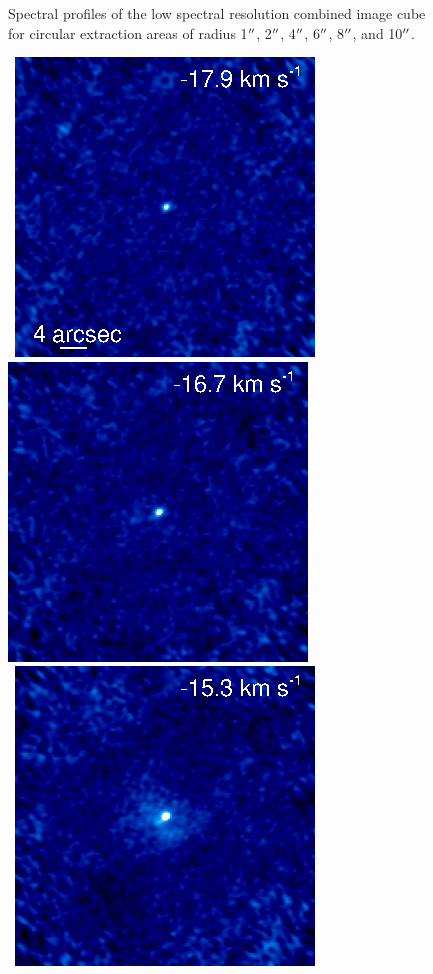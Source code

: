 \documentclass[preprint2]{aastex}
\begin{document}
\clearpage

\begin{figure}
\caption{Spectral profiles of the low spectral resolution combined image cube for circular extraction areas of radius 1$\mbox{$^{\prime\prime}$}$, 2$\mbox{$^{\prime\prime}$}$, 4$\mbox{$^{\prime\prime}$}$, 6$\mbox{$^{\prime\prime}$}$, 8$\mbox{$^{\prime\prime}$}$, and 10$\mbox{$^{\prime\prime}$}$.}
\label{fig:fig4}
\end{figure}

\clearpage

\begin{figure}[hbt!]
\mbox{
          \includegraphics[]{chan41.ps}
          \includegraphics[]{chan40.ps}
          }
\\
\mbox{
          \includegraphics[]{chan39.ps}
}
\end{figure}
\end{document}
